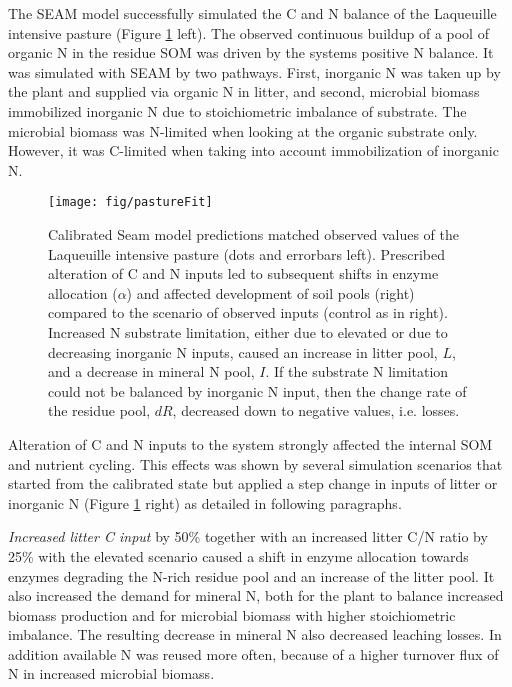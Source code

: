 The SEAM model successfully simulated the C and N balance of the Laqueuille
intensive pasture (Figure \ref{fig:pastureFit} left). The observed continuous
buildup of a pool of organic N in the residue SOM was driven by the systems
positive N balance. It was simulated with SEAM by two pathways. First, inorganic
N was taken up by the plant and supplied via organic N in litter, and second,
microbial biomass immobilized inorganic N due to stoichiometric imbalance of
substrate. The microbial biomass was N-limited when looking at the organic
substrate only. However, it was C-limited when taking into account
immobilization of inorganic N.

\begin{figure}[t] \vspace*{2mm}
\begin{center}
\texttt{[image: fig/pastureFit]} 
\end{center}
\caption{
Calibrated Seam model predictions matched observed values of the Laqueuille
intensive pasture (dots and errorbars left). Prescribed alteration of C and N
inputs led to subsequent shifts in enzyme allocation ($\alpha$) and affected
development of soil pools (right) compared to the scenario of observed inputs
(control as in right).
Increased N substrate limitation, either due to elevated  or due to
decreasing inorganic N inputs, caused an increase in litter pool, $L$, and a
decrease in mineral N pool, $I$. If the substrate N limitation could not be
balanced by inorganic N input, then the change rate of the residue pool, $dR$,
decreased down to negative values, i.e. losses.
\label{fig:pastureFit}
}
\end{figure}   

Alteration of C and N inputs to the system strongly affected the internal SOM
and nutrient cycling. This effects was shown by several simulation scenarios
that started from the calibrated state but applied a step change in inputs of
litter or inorganic N (Figure \ref{fig:pastureFit} right) as detailed in
following paragraphs.

\textit{Increased litter C input} by 50\% together with an increased litter C/N
ratio by 25\% with the elevated  scenario caused a shift in enzyme
allocation towards enzymes degrading the N-rich residue pool and an increase of
the litter pool. It also increased the demand for mineral N, both for the plant
to balance increased biomass production and for microbial biomass with higher
stoichiometric imbalance. The resulting decrease in mineral N also decreased
leaching losses.
In addition available N was reused more often, because of a higher
turnover flux of N in increased microbial biomass.

